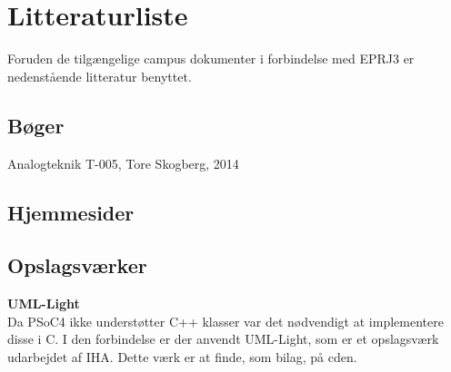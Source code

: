 \chapter{Litteraturliste}
Foruden de tilgængelige campus dokumenter i forbindelse med EPRJ3 er nedenstående litteratur benyttet. 

\section{Bøger}
Analogteknik T-005, Tore Skogberg, 2014


\section{Hjemmesider}



\section{Opslagsværker}

\textbf{UML-Light}\\
Da PSoC4 ikke understøtter C++ klasser var det nødvendigt at implementere disse i C. I den forbindelse er der anvendt UML-Light, som er et opslagsværk udarbejdet af IHA. Dette værk er at finde, som bilag, på cden. 